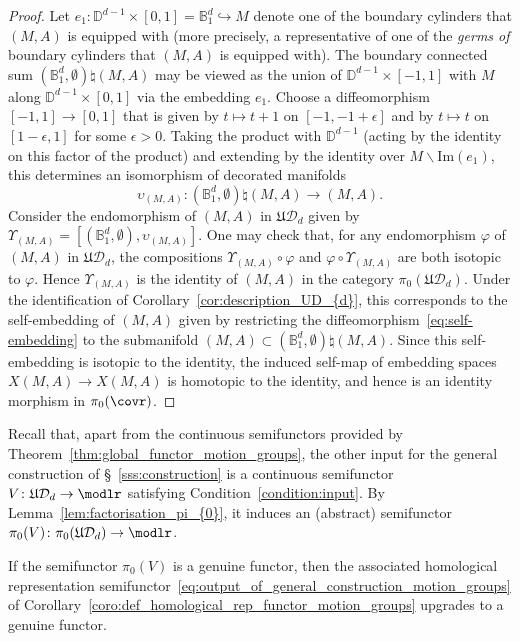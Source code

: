 \documentclass[AHL,Unicode,published]{cedram}
\newcommand{\im}{\mathrm{Im}}
\newcommand{\fU}{\ensuremath{\mathfrak{U}}}
\newcommand{\cD}{\mathcal{D}}
\newcommand{\bB}{\mathbb{B}}
\newcommand{\bD}{\mathbb{D}}
\newcommand{\too}{\ensuremath{\longrightarrow}}
\begin{document}
\begin{proof}
Let $e_{1} \colon \bD^{d-1} \times [0,1] = \bB_{1}^d \hookrightarrow M$ denote one of the boundary cylinders that $(M,A)$ is equipped with (more precisely, a representative of one of the \emph{germs of} boundary cylinders that $(M,A)$ is equipped with). The boundary connected sum $(\bB_{1}^d,\emptyset) \natural (M,A)$ may be viewed as the union of $\bD^{d-1} \times [-1,1]$ with $M$ along $\bD^{d-1} \times [0,1]$ via the embedding $e_{1}$. Choose a diffeomorphism $[-1,1] \to [0,1]$ that is given by $t \mapsto t+1$ on $[-1,-1+\epsilon]$ and by $t \mapsto t$ on $[1-\epsilon,1]$ for some $\epsilon > 0$. Taking the product with $\bD^{d-1}$ (acting by the identity on this factor of the product) and extending by the identity over $M \smallsetminus \im(e_{1})$, this determines an isomorphism of decorated manifolds
\begin{equation}\label{eq:self-embedding}
\upsilon_{(M,A)} \colon \left(\bB_{1}^d, \emptyset\right) \natural (M,A) \too (M,A).
\end{equation}
Consider the endomorphism of $(M,A)$ in $\fU\cD_{d}$ given by $\varUpsilon_{(M,A)} = [(\bB_{1}^d, \emptyset), \upsilon_{(M,A)}]$. One may check that, for any endomorphism $\varphi$ of $(M,A)$ in $\fU\cD_{d}$, the compositions $\varUpsilon_{(M,A)} \circ \varphi$ and $\varphi \circ \varUpsilon_{(M,A)}$ are both isotopic to $\varphi$. Hence $\varUpsilon_{(M,A)}$ is the identity of $(M,A)$ in the category $\pi_{0}(\fU\cD_{d})$. Under the identification of Corollary~\ref{cor:description_UD_{d}}, this corresponds to the self-embedding of $(M,A)$ given by restricting the diffeomorphism~\eqref{eq:self-embedding} to the submanifold $(M,A) \subset (\bB_{1}^d,\emptyset) \natural (M,A)$. Since this self-embedding is isotopic to the identity, the induced self-map of embedding spaces $X(M,A) \to X(M,A)$ is homotopic to the identity, and hence is an identity morphism in $\pi_{0}(\covr)$.
\end{proof}

Recall that, apart from the continuous semifunctors provided by Theorem~\ref{thm:global_functor_motion_groups}, the other input for the general construction of \S~\ref{sss:construction} is a continuous semifunctor $V \colon \fU\cD_{d} \to \modlr$ satisfying Condition~\ref{condition:input}. By Lemma~\ref{lem:factorisation_pi_{0}}, it induces an (abstract) semifunctor $\pi_{0}(V) \colon \pi_{0}(\fU\cD_{d}) \to \modlr$.

\begin{coro}\label{cor:homological_rep_genuine_functor}
If the semifunctor $\pi_{0}(V)$ is a genuine functor, then the associated homological representation semifunctor~\eqref{eq:output_of_general_construction_motion_groups} of Corollary~\ref{coro:def_homological_rep_functor_motion_groups} upgrades to a genuine functor.
\end{coro}
\end{document}
